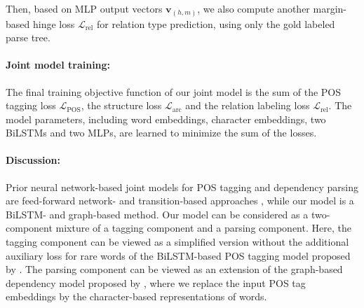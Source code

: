 \documentclass[11pt,letterpaper]{article}
\begin{document}
Then, based on MLP output vectors ${\textbf{v}}_{(h,m)}$, we also compute another margin-based hinge loss $\mathcal{L}_{\text{rel}}$  for relation type prediction, using only the gold labeled parse tree.   


\paragraph{Joint model training:} The final training objective function of our joint model is the sum of the POS tagging loss $\mathcal{L}_{\text{POS}}$, the structure loss $\mathcal{L}_{\text{arc}}$ and the relation labeling loss $\mathcal{L}_{\text{rel}}$. The model parameters, including word embeddings, character embeddings,  two BiLSTMs and two MLPs, are learned to minimize the sum of the losses.


\paragraph{Discussion:} Prior neural network-based joint models for  POS tagging and dependency parsing are feed-forward network- and transition-based approaches \citep{alberti-EtAl:2015:EMNLP,zhang-weiss:2016:P16-1}, while our model is a BiLSTM- and graph-based method.  Our model  can be considered as a two-component mixture of a tagging  component and a parsing component. Here, the tagging component can be viewed as a simplified version without  the additional auxiliary loss for rare words of the  BiLSTM-based POS tagging model proposed by \citet{plankP16}. The parsing component can be viewed as an extension of the  graph-based dependency model proposed by \citet{TACL885}, where we replace the input POS tag embeddings by the character-based representations of words. 
\end{document}
